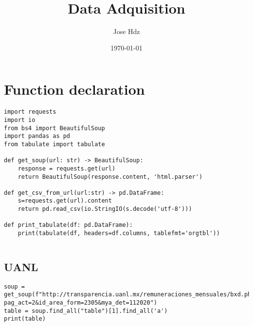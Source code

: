 \documentclass[11pt]{article}
\author{Jose Hdz}
\date{\today}
\title{Data Adquisition}
\begin{document}
\maketitle
\tableofcontents


\section{Function declaration}
\label{sec:org83c2d10}

\begin{verbatim}
import requests
import io
from bs4 import BeautifulSoup
import pandas as pd
from tabulate import tabulate

def get_soup(url: str) -> BeautifulSoup:
    response = requests.get(url)
    return BeautifulSoup(response.content, 'html.parser')

def get_csv_from_url(url:str) -> pd.DataFrame:
    s=requests.get(url).content
    return pd.read_csv(io.StringIO(s.decode('utf-8')))

def print_tabulate(df: pd.DataFrame):
    print(tabulate(df, headers=df.columns, tablefmt='orgtbl'))


\end{verbatim}

\subsection{UANL}
\label{sec:orga5c18c9}

\begin{verbatim}
soup = get_soup(f"http://transparencia.uanl.mx/remuneraciones_mensuales/bxd.php?pag_act=2&id_area_form=2305&mya_det=112020")
table = soup.find_all("table")[1].find_all('a')
print(table)
\end{verbatim}
\end{document}
